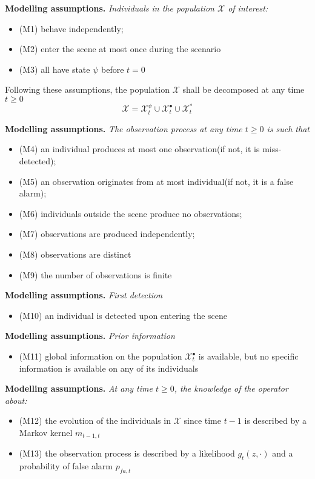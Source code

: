 \documentclass[a4paper, 11pt]{article}
\begin{document}
\begin{CJK}{UTF8}{gbsn}
\textbf{Modelling assumptions.} \emph{Individuals in the population $\mathcal{X}$ of interest:}
\begin{itemize}
  \item (M1) behave independently;
  \item (M2) enter the scene at most once during the scenario
  \item (M3) all have state $\psi$ before $t=0$
\end{itemize}
Following these assumptions, the population $\mathcal{X}$ shall be decomposed at any time $t \geq 0$
\[
\mathcal{X} = \mathcal{X}_t^{\psi} \cup \mathcal{X}_t^{\bullet} \cup \mathcal{X}_t^{*}
\]

\textbf{Modelling assumptions.} \emph{The observation process at any time $t \geq 0$ is such that}
\begin{itemize}
  \item  (M4) an individual produces at most one observation(if not, it is miss-detected);
  \item  (M5) an observation originates from at most individual(if not, it is a false alarm);
  \item  (M6) individuals outside the scene produce no observations;
  \item  (M7) observations are produced independently;
  \item  (M8) observations are distinct
  \item  (M9) the number of observations is finite
\end{itemize}


\textbf{Modelling assumptions.} \emph{First detection}
\begin{itemize}
  \item  (M10) an individual is detected upon entering the scene
\end{itemize}

\textbf{Modelling assumptions.} \emph{Prior information}
\begin{itemize}
  \item  (M11)  global information on the population $\mathcal{X}_t^{\bullet}$ is available, but no specific information is available on any of its individuals
\end{itemize}

\textbf{Modelling assumptions.} \emph{At any time $t \geq 0$, the knowledge of the operator about:}
\begin{itemize}
  \item  (M12) the evolution of the individuals in $\mathcal{X}$ since time $t-1$ is described by a Markov kernel $m_{t-1,t}$
  \item  (M13) the observation process is described by a likelihood $g_t(z,\cdot)$ and a probability of false alarm $p_{fa,t}$
\end{itemize}

\end{CJK}
\end{document}
